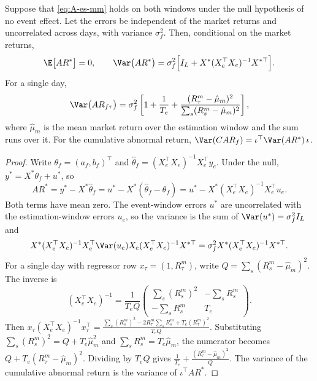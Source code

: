 \begin{proposition}\label{prop:A-es-arvar}
Suppose that \eqref{eq:A-es-mm} holds on both windows under the null hypothesis of no event effect. Let the errors
be independent of the market returns and uncorrelated across days, with variance $\sigma_f^2$. Then, conditional on
the market returns,
\begin{equation*}
\E\big[AR^*\big]=0,\qquad \Var\big(AR^*\big)=\sigma_f^2\Big[I_L+X^*(X_e^\top X_e)^{-1}X^{*\top}\Big].
\end{equation*}
For a single day,
\begin{equation*}
\Var\big(AR_{f\tau}\big)=\sigma_f^2\left[1+\frac{1}{T_e}+\frac{(R^m_\tau-\hat\mu_m)^2}{\sum_{s}(R^m_s-\hat\mu_m)^2}\right],
\end{equation*}
where $\hat\mu_m$ is the mean market return over the estimation window and the sum runs over it. For the
cumulative abnormal return, $\Var(CAR_f)=\iota^\top\Var(AR^*)\,\iota$.
\end{proposition}

\begin{proof}
Write $\theta_f=(a_f,b_f)^\top$ and $\hat\theta_f=(X_e^\top X_e)^{-1}X_e^\top y_e$. Under the null,
$y^*=X^*\theta_f+u^*$, so
\begin{equation*}
AR^*=y^*-X^*\hat\theta_f=u^*-X^*(\hat\theta_f-\theta_f)=u^*-X^*(X_e^\top X_e)^{-1}X_e^\top u_e .
\end{equation*}
Both terms have mean zero. The event-window errors $u^*$ are uncorrelated with the estimation-window errors $u_e$,
so the variance is the sum of $\Var(u^*)=\sigma_f^2I_L$ and
\begin{equation*}
X^*(X_e^\top X_e)^{-1}X_e^\top\Var(u_e)X_e(X_e^\top X_e)^{-1}X^{*\top}=\sigma_f^2X^*(X_e^\top X_e)^{-1}X^{*\top}.
\end{equation*}
For a single day with regressor row $x_\tau=(1,R^m_\tau)$, write $Q=\sum_s(R^m_s-\hat\mu_m)^2$. The inverse is
\begin{equation*}
(X_e^\top X_e)^{-1}=\frac{1}{T_eQ}\begin{pmatrix}\sum_s(R^m_s)^2 & -\sum_sR^m_s\\ -\sum_sR^m_s & T_e\end{pmatrix}.
\end{equation*}
Then $x_\tau(X_e^\top X_e)^{-1}x_\tau^\top=\frac{\sum_s(R^m_s)^2-2R^m_\tau\sum_sR^m_s+T_e(R^m_\tau)^2}{T_eQ}$.
Substituting $\sum_s(R^m_s)^2=Q+T_e\hat\mu_m^2$ and $\sum_sR^m_s=T_e\hat\mu_m$, the numerator becomes
$Q+T_e(R^m_\tau-\hat\mu_m)^2$. Dividing by $T_eQ$ gives $\frac{1}{T_e}+\frac{(R^m_\tau-\hat\mu_m)^2}{Q}$. The variance
of the cumulative abnormal return is the variance of $\iota^\top AR^*$.
\end{proof}

